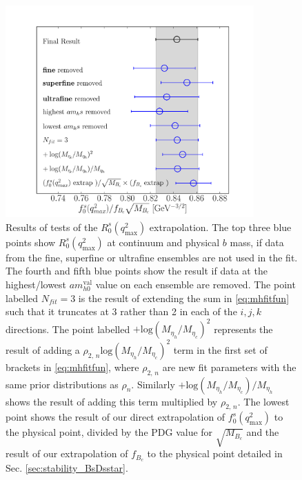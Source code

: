 \begin{figure}[htb!]
  \begin{center}
  \hspace{-20pt}
  \includegraphics[width=0.85\textwidth]{images/BsDs/ratio/f0dcq2max_stability.pdf}
  \caption{ Results of tests of the $R_0^s(q^2_{\text{max}})$ extrapolation. The top three blue points show $R_0^s(q^2_{\text{max}})$ at continuum and physical $b$ mass, if data from the fine, superfine or ultrafine ensembles are not used in the fit. The fourth and fifth blue points show the result if data at the highest/lowest $am_{h0}^{\text{val}}$ value on each ensemble are removed. The point labelled $N_{fit}=3$ is the result of extending the sum in \eqref{eq:mhfitfun} such that it truncates at 3 rather than 2 in each of the $i,j,k$ directions. The point labelled $+\text{log}(M_{\eta_h}/M_{\eta_c})^2$ represents the result of adding a $\rho_{2,\,n} \text{log}(M_{\eta_h}/M_{\eta_c})^2$ term in the first set of brackets in \eqref{eq:mhfitfun}, where $\rho_{2,\,n}$ are new fit parameters with the same prior distributions as $\rho_{n}$. Similarly $+\text{log}(M_{\eta_h}/M_{\eta_c})/M_{\eta_h}$ shows the result of adding this term multiplied by $\rho_{2,\,n}$. The lowest point shows the result of our direct extrapolation of $f_0^s(q^2_{\text{max}})$ to the physical point, divided by the PDG value for $\sqrt{M_{B_c}}$ \cite{PhysRevD.98.030001} and the result of our extrapolation of $f_{B_c}$ to the physical point detailed in Sec. \ref{sec:stability_BsDsstar}.
    \label{fig:ratiotests}}
  \end{center}
\end{figure}

